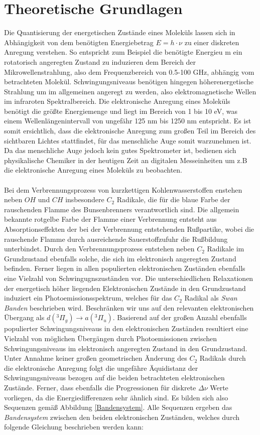 %
%

\section{Theoretische Grundlagen}
Die Quantisierung der energetischen Zustände eines Moleküls lassen sich in Abhängigkeit von dem benötigten Energiebetrag $E = h \cdot \nu$ zu einer diskreten Anregung verstehen. So entspricht zum Beispiel die benötigte Energieu m ein rotatorisch angeregten Zustand zu induzieren dem Bereich der Mikrowellenstrahlung, also dem Frequenzbereich von 0.5-100 GHz, abhängig vom betrachteten Molekül. Schwingungsniveaus benötigen hingegen höherenergetische Strahlung um im allgemeinen angeregt zu werden, also elektromagnetische Wellen im infraroten Spektralbereich. Die elektronische Anregung eines Moleküls benötigt die größte Energiemenge und liegt im Bereich von 1 bis 10 eV, was einem Wellenlängenintervall von ungefähr 125 nm bis 1250 nm entspricht. Es ist somit ersichtlich, dass die elektronische Anregung zum großen Teil im Bereich des sichtbaren Lichtes stattfindet, für das menschliche Auge somit warzunehmen ist. Da das menschliche Auge jedoch kein gutes Spektrometer ist, bedienen sich physikalische Chemiker in der heutigen Zeit an digitalen Messeinheiten um z.B die elektronische Anregung eines Moleküls zu beobachten.\\
\\
Bei dem Verbrennungsprozess von kurzkettigen Kohlenwasserstoffen enstehen neben $OH$ und $CH$ insbesondere $C_2$ Radikale, die für die blaue Farbe der rauschenden Flamme des Bunsenbrenners verantwortlich sind. Die allgemein bekannte rotgelbe Farbe der Flamme einer Verbrennung entsteht aus Absorptionseffekten der bei der Verbrennung entstehenden Rußpartike, wobei die rauschende Flamme durch ausreichende Sauerstoffzufuhr die Rußbildung unterbindet. Durch den Verbrennungsprozess entstehen neben $C_2$ Radikale im Grundzustand ebenfalls solche, die sich im elektronisch angeregten Zustand befinden. Ferner liegen in allen populierten elektronischen Zuständen ebenfalls eine Vielzahl von Schwingugnszuständen vor. Die unterschiedlichen Relaxationen der energetisch höher liegenden Elektronischen Zustände in den Grundzustand  induziert ein Photoemissionsspektrum, welches für das $C_2$ Radikal als \textit{Swan Banden} beschrieben wird. Beschränken wir uns auf den relevanten elektronischen Übergang als $d(^3\Pi_g) \rightarrow a(^3\Pi_u)$. Basierend auf der großen Anzahl ebenfalls populierter Schwingungsniveaus in den elektronischen Zuständen resultiert eine Vielzahl von möglichen Übergängen durch Photoemissionen zwischen Schwingungsniveaus im elektronisch angeregten Zustand in den Grundzustand. Unter Annahme keiner großen geometrischen Änderung des $C_2$ Radikals durch die elektronische Anregung folgt die ungefähre Äquidistanz der Schwingungsniveaus bezogen auf die beiden betrachteten elektronischen Zustände. Ferner, dass ebenfalls die Progressionen für diskrete $\Delta \nu$ Werte vorliegen, da die Energiedifferenzen sehr ähnlich sind. Es bilden sich also Sequenzen gemäß Abbildung \ref{Bandensystem}. Alle Sequenzen ergeben das \textit{Bandensystem} zwischen den beiden elektronischen Zuständen, welches durch folgende Gleichung beschrieben werden kann: 
